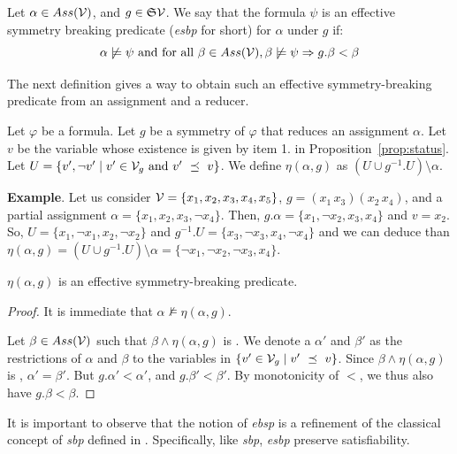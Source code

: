 \begin{definition}
 \label{def:esbp}
 Let $\alpha \in Ass(\mathcal{V})$, and $g \in \mathfrak{S}{\mathcal{V}}$.
 We say that the formula $\psi$ is an effective symmetry breaking predicate (\textit{esbp} for short) for $\alpha$ under $g$ if:
 $$\alpha \not\models \psi \text{ and for all }\beta \in Ass(\mathcal{V}), \beta \not\models \psi \Rightarrow g.\beta < \beta$$
\end{definition}
The next definition gives a way to obtain such an effective symmetry-breaking predicate from an assignment and a reducer.
\begin{definition}
 \label{def:eta}
 Let $\varphi$ be a formula.
 Let $g$ be a symmetry of $\varphi$ that reduces an assignment $\alpha$.
 Let $v$ be the variable whose existence is given by item 1. in Proposition~\ref{prop:status}.
 Let $U = \{ v', \neg v' \mid v' \in \mathcal{V}_g \text{ and } v'~\preceq~v\}$.
 We define $\eta(\alpha, g)$ as $(U \cup g^{-1}.U) \setminus \alpha$.
\end{definition}
\textbf{Example}. Let us consider $\mathcal{V} = \{x_1, x_2, x_3, x_4, x_5\}$, $g =
(x_1\,x_3)(x_2\,x_4)$, and a partial assignment $\alpha = \{x_1, x_2,
x_3, \neg x_4\}$. Then, $g.\alpha = \{x_1, \neg x_2, x_3, x_4\}$ and $v = x_2$.
So, $U = \{x_1, \neg x_1, x_2, \neg x_2\}$ and $g^{-1}.U = \{x_3, \neg x_3,
x_4, \neg x_4\}$ and we can deduce than $\eta(\alpha, g) = (U \cup g^{-1}.U)
\setminus \alpha = \{\neg x_1, \neg x_2, \neg x_3, x_4\}$.
\begin{proposition}
 \label{prop:eta}
 $\eta(\alpha, g)$ is an effective symmetry-breaking predicate.
\end{proposition}
\begin{proof}
 It is immediate that $\alpha \not\models \eta(\alpha, g)$.
 
 Let $\beta \in Ass(\mathcal{V})$ such that $\beta \wedge \eta(\alpha, g)$ is \unsat. We denote a $\alpha'$
 and $\beta'$ as the restrictions of $\alpha$ and $\beta$ to the variables in $\{ v' \in
 \mathcal{V}_g \mid v'~\preceq~v \}$. Since $\beta \wedge \eta(\alpha, g)$ is \unsat, $\alpha' = \beta'$.
 But $g.\alpha' < \alpha'$, and $g.\beta' < \beta'$. By monotonicity of $<$, we thus also have
 $g.\beta < \beta$. \end{proof}
\medskip\noindent It is important to observe that the notion of \textit{ebsp}
is a refinement of the classical concept of \textit{sbp} defined in \cite{aloul06}. Specifically, like \textit{sbp}, \textit{esbp} preserve satisfiability.

